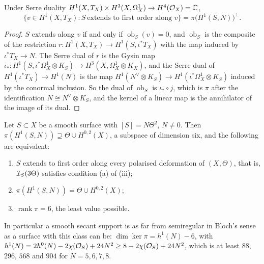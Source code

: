 \begin{lemma}[Duality]\label{lem:blochduality}
Under Serre duality $H^{1}(X,T_{X})\times H^{3}(X,\Omega^{1}_{X})\to H^{4}(\mathcal{O}_{X})=\mathbb{C}$,
\[
  \{v\in H^{1}(X,T_{X}):S\ \text{extends to first order along }v\}
  =\pi\bigl(H^{1}(S,N)\bigr)^{\perp}.
\]
\end{lemma}

\begin{proof}
$S$ extends along $v$ if and only if $\operatorname{ob}_{S}(v)=0$, and
$\operatorname{ob}_{S}$ is the composite of the restriction
$r\colon H^{1}(X,T_{X})\to H^{1}(S,\iota^{*}T_{X})$ with the map induced by
$\iota^{*}T_{X}\to N$. The Serre dual of $r$ is the Gysin map
$\iota_{*}\colon H^{1}(S,\iota^{*}\Omega^{1}_{X}\otimes K_{S})\to H^{3}(X,\Omega^{1}_{X}\otimes K_{X})$,
and the Serre dual of $H^{1}(\iota^{*}T_{X})\to H^{1}(N)$ is the map
$H^{1}(N^{\vee}\otimes K_{S})\to H^{1}(\iota^{*}\Omega^{1}_{X}\otimes K_{S})$
induced by the conormal inclusion. So the dual of $\operatorname{ob}_{S}$ is
$\iota_{*}\circ j$, which is $\pi$ after the identification
$N\cong N^{\vee}\otimes K_{S}$, and the kernel of a linear map is the
annihilator of the image of its dual.
\end{proof}

\begin{proposition}
\label{prop:smoothrank}
Let $S\subset X$ be a smooth surface with $[S]=N\Theta^{2}$, $N\ne0$. Then
$\pi(H^{1}(S,N))\supseteq\Theta\cup H^{0,2}(X)$, a subspace of dimension six,
and the following are equivalent:
\begin{enumerate}[label=\textup{(\roman*)},nosep,leftmargin=2.2em]
\item $S$ extends to first order along every polarised deformation of
  $(X,\Theta)$, that is, $\mathcal{I}_{S}(3\Theta)$ satisfies condition (a) of
  (iii);
\item $\pi(H^{1}(S,N))=\Theta\cup H^{0,2}(X)$;
\item $\operatorname{rank}\pi=6$, the least value possible.
\end{enumerate}
In particular a smooth secant support is as far from semiregular in Bloch's
sense as a surface with this class can be: $\dim\ker\pi=h^{1}(N)-6$, with
$h^{1}(N)=2h^{0}(N)-2\chi(\mathcal{O}_{S})+24N^{2}\ge8-2\chi(\mathcal{O}_{S})+24N^{2}$, which
is at least $88$, $296$, $568$ and $904$ for $N=5,6,7,8$.
\end{proposition}

